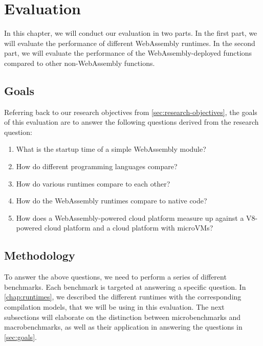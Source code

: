 \chapter{Evaluation}
\label{chap:evaluation}

In this chapter, we will conduct our evaluation in two parts. In the first part, we will evaluate the performance of different WebAssembly runtimes. In the second part, we will evaluate the performance of the WebAssembly-deployed functions compared to other non-WebAssembly functions.

\section{Goals}
\label{sec:goals}
%
Referring back to our research objectives from \autoref{sec:research-objectives}, the goals of this evaluation are to answer the following questions derived from the research question:
\begin{enumerate}
    \item What is the startup time of a simple \gls{WebAssembly} module?
    \item How do different programming languages compare?
    \item How do various runtimes compare to each other?
    \item How do the WebAssembly runtimes compare to native code?
    \item How does a WebAssembly-powered cloud platform measure up against a V8-powered cloud platform and a cloud platform with microVMs?
\end{enumerate}

\section{Methodology}
\label{sec:methodology}

To answer the above questions, we need to perform a series of different benchmarks. Each benchmark is targeted at answering a specific question. In \autoref{chap:runtimes}, we described the different runtimes with the corresponding compilation models, that we will be using in this evaluation. The next subsections will elaborate on the distinction between microbenchmarks and macrobenchmarks, as well as their application in answering the questions in \autoref{sec:goals}.

